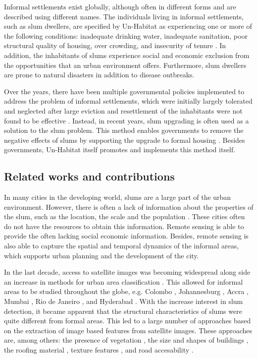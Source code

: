 Informal settlements exist globally, although often in different forms and are described using different names. The individuals living in informal settlements, such as slum dwellers, are specified by Un-Habitat as experiencing one or more of the following conditions: inadequate  drinking  water, inadequate  sanitation, poor  structural quality of housing, over crowding, and insecurity of tenure \cite{un2015slum}. In addition, the inhabitants of slums experience social and economic exclusion from the opportunities that an urban environment offers. Furthermore, slum dwellers are prone to natural disasters in addition to disease outbreaks. 

Over the years, there have been multiple governmental policies implemented to address the problem of informal settlements, which were initially largely tolerated and neglected after large eviction and resettlement of the inhabitants were not found to be effective \cite{kuffer2016slums}. Instead, in recent years, slum upgrading is often used as a solution to the slum problem. This method enables governments to remove the negative effects of slums by supporting the upgrade to formal housing \cite{cobbett2013cities}. Besides governments, Un-Habitat itself promotes and implements this method itself\cite{2015globact}.

\subsection{Related works and contributions}
In many cities in the developing world, slums are a large part of the urban environment. However, there is often a lack of information about the properties of the slum, such as the location, the scale and the population \cite{kuffer2016slums}. These cities often do not have the resources to obtain this information. Remote sensing is able to provide the often lacking  social economic information. Besides, remote sensing is also able to capture the spatial and temporal dynamics of the informal areas, which supports urban planning and the development of the city.

In the last decade, access to satellite images was becoming widespread along side an increase in methods for urban area classification \cite{kuffer2016slums}. This allowed for informal areas to be studied throughout the globe, e.g. Colombo \cite{colombo}, Johannesburg \cite{williams2016automatic}, Accra \cite{accra}, Mumbai \cite{mumbai}, Rio de Janeiro \cite{hofmann2008detecting}, and Hyderabad \cite{hyderabad}. With the increase interest in slum detection, it became apparent that the structural characteristics of slums were quite different from formal areas. This led to a large number of approaches based on the extraction of  image based features from satellite images. These approaches are, among others: the presence of vegetation \cite{niebergall2007object}, the size and shapes of buildings \cite{hofmann2008detecting}, the roofing material \cite{williams2016automatic}, texture features \cite{mattia2007exploiting}, and road accesability \cite{owen2013approach}.

